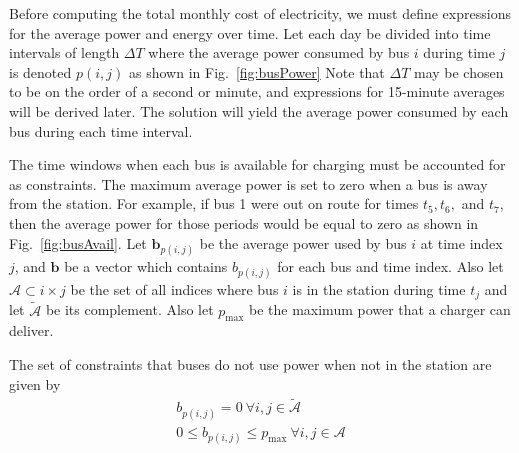 Before computing the total monthly cost of electricity, we must define expressions for the average power and energy over time.  Let each day be divided into time intervals of length $\Delta T$ where the average power consumed by bus $i$ during time $j$ is denoted $p(i,j)$ as shown in Fig.~\ref{fig:busPower} Note that $\Delta T$ may be chosen to be on the order of a second or minute, and expressions for 15-minute averages will be derived later. The solution will yield the average power consumed by each bus during each time interval.
\par The time windows when each bus is available for charging must be accounted for as constraints.  The maximum average power is set to zero when a bus is away from the station. For example, if bus 1 were out on route for times $t_5, t_6,$ and $t_7$, then the average power for those periods would be equal to zero as shown in Fig.~\ref{fig:busAvail}. Let $\bm{b}_{p(i,j)}$ be the average power used by bus $i$ at time index $j$, and $\bm{b}$ be a vector which contains $b_{p(i,j)}$ for each bus and time index. Also let $\mathcal{A} \subset {i\times j}$  be the set of all indices where bus $i$ is in the station during time $t_j$ and let $\tilde{\mathcal{A}}$ be its complement. Also let $p_{\text{max}}$ be the maximum power that a charger can deliver. 
\par The set of constraints that buses do not use power when not in the station are given by
\begin{gather}\label{eqn:obj:power2}
	b_{p(i,j)} = 0 \ \forall i,j \in \tilde{\mathcal{A}}  \\
	0 \leq b_{p(i,j)} \leq p_{\text{max}} \ \forall i,j \in \mathcal{A}
\end{gather}

